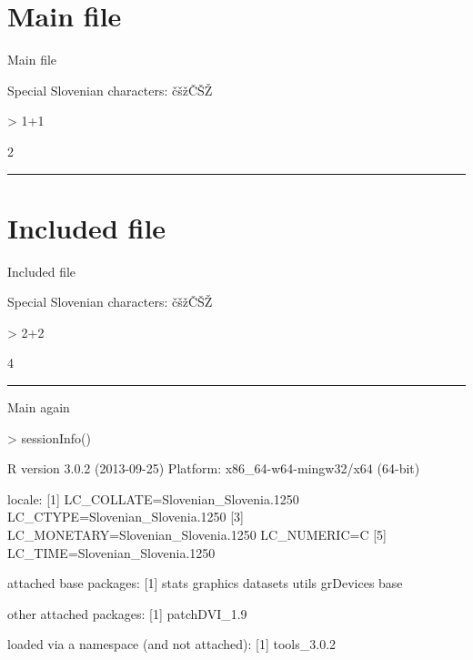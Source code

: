 \documentclass[a4paper,12pt]{article}
\begin{document}
\section{Main file}
Main file

Special Slovenian characters: čšžČŠŽ

\begin{Schunk}
\begin{Sinput}
> 1+1
\end{Sinput}
\begin{Soutput}
[1] 2
\end{Soutput}
\end{Schunk}

\hrule
\usepackage[utf8]{inputenc} %

\section{Included file}
Included file

Special Slovenian characters: čšžČŠŽ

\begin{Schunk}
\begin{Sinput}
> 2+2
\end{Sinput}
\begin{Soutput}
[1] 4
\end{Soutput}
\end{Schunk}

\hrule

Main again
\begin{Schunk}
\begin{Sinput}
> sessionInfo()
\end{Sinput}
\begin{Soutput}
R version 3.0.2 (2013-09-25)
Platform: x86_64-w64-mingw32/x64 (64-bit)

locale:
[1] LC_COLLATE=Slovenian_Slovenia.1250  LC_CTYPE=Slovenian_Slovenia.1250   
[3] LC_MONETARY=Slovenian_Slovenia.1250 LC_NUMERIC=C                       
[5] LC_TIME=Slovenian_Slovenia.1250    

attached base packages:
[1] stats     graphics  datasets  utils     grDevices base     

other attached packages:
[1] patchDVI_1.9

loaded via a namespace (and not attached):
[1] tools_3.0.2
\end{Soutput}
\end{Schunk}
\end{document}
